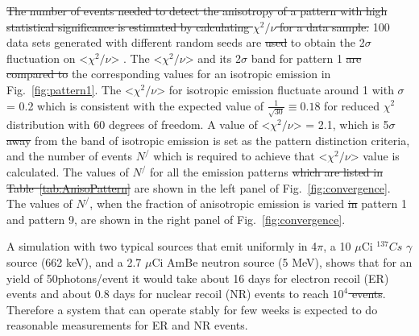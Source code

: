 \sout{The number of events needed to detect the anisotropy of a pattern with 
high statistical significance is estimated by calculating $\chi^2/\nu$ 
for a data sample.} 100 data sets generated with different random seeds are 
\sout{used}  to obtain the 2$\sigma$ fluctuation on <$\chi^2/\nu$> . The <$\chi^2/\nu$> 
and its 2$\sigma$ band for pattern 1 \sout{are compared to}  the corresponding values 
for an isotropic emission in Fig.~\ref{fig:pattern1}. The <$\chi^2/\nu$> for 
isotropic emission fluctuate around 1 with $\sigma$ = 0.2 which is consistent with 
the expected value of $\frac{1}{\sqrt{30}} \equiv 0.18$ for reduced $\chi^2$ distribution 
with 60 degrees of freedom. A value of <$\chi^2/\nu$> = 2.1, which is 5$\sigma$ \sout{away} from the 
band of isotropic emission is set as the pattern distinction criteria, and the number of events 
$N^{/}$ which is required to achieve that <$\chi^2/\nu$> value is calculated. The values of 
$N^{/}$  for all the emission patterns \sout{which are listed in Table~\ref{tab:AnisoPattern}} are shown 
in the left panel of Fig.~\ref{fig:convergence}. The values of $N^{/}$, when the fraction of anisotropic 
emission is varied \sout{in} pattern 1 and pattern 9, are shown in the right panel of Fig.~\ref{fig:convergence}. 

A simulation with two typical sources that emit uniformly in 4$\pi$, a 10 $\mu$Ci $^{137}Cs$ $\gamma$ 
source (662 keV), and a 2.7 $\mu$Ci AmBe neutron source (5 MeV), shows that for an yield of 
50photons/event it would take about 16 days for electron recoil (ER) events and about 0.8 days for 
nuclear recoil (NR) events to reach  \sout{$10^4$ events}. Therefore a system that can operate stably for few weeks 
is expected to do reasonable measurements for ER and NR events.

